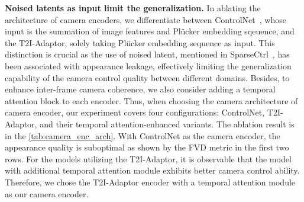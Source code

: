 \noindent \textbf{Noised latents as input limit the generalization.} 
In ablating the architecture of camera encoders, we differentiate between ControlNet~\citep{controlnet}, whose input is the summation of image features and Plücker embedding sqeuence, and the T2I-Adaptor, solely taking Plücker embedding sequence as input. 
%
This distinction is crucial as the use of noised latent, mentioned in SparseCtrl~\citep{sparsectrl}, has been associated with appearance leakage, effectively limiting the generalization capability of the camera control quality between different domains.
%
Besides, to enhance inter-frame camera coherence, we also consider adding a temporal attention block to each encoder.
%
Thus, when choosing the camera architecture of camera encoder, our experiment covers four configurations: ControlNet, T2I-Adaptor, and their temporal attention-enhanced variants.
%
The ablation result is in the \cref{tab:camera_enc_arch}. 
%
With ControlNet as the camera encoder, the appearance quality is suboptimal as shown by the FVD metric in the first two rows.
%
For the models utilizing the T2I-Adaptor, it is observable that the model with additional temporal attention module exhibits better camera control ability.
%
Therefore, we chose the T2I-Adaptor encoder with a temporal attention module as our camera encoder.


